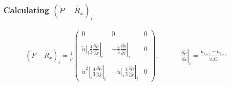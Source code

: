 \documentclass[11pt, a4paper]{article}
\newcommand{\parder}[2]{\frac{\partial {#1}}{\partial {#2}}}
\begin{document}
\subsubsection{Calculating $\left(\tilde{P}-\tilde{R_x}\right)_{i}$}
\begin{equation}
    \begin{matrix}
        \left(\tilde{P}-\tilde{R_x}\right)_{i}=\displaystyle\frac{1}{\rho}\begin{pmatrix}
                0 & 0 & 0 \\\\
                \displaystyle\left.\tilde{u}\right|_i\frac{4}{3}\left.\parder{\tilde{\mu}}{\tilde{x}}\right|_i & \displaystyle-\frac{4}{3}\left.\parder{\tilde{\mu}}{\tilde{x}}\right|_i & 0 \\\\
                \displaystyle\left.\tilde{u}^2\right|_i\frac{4}{3}\left.\parder{\tilde{\mu}}{\tilde{x}}\right|_i & \displaystyle-\left.\tilde{u}\right|_i\frac{4}{3}\left.\parder{\tilde{\mu}}{\tilde{x}}\right|_i & 0
            \end{pmatrix},\hspace{1cm} & \displaystyle\left.\parder{\tilde{\mu}}{\tilde{x}}\right|_i=\frac{\tilde{\mu}_{i+1}-\tilde{\mu}_{i-1}}{2\Delta\tilde{x}}
    \end{matrix}
\end{equation}
\end{document}

